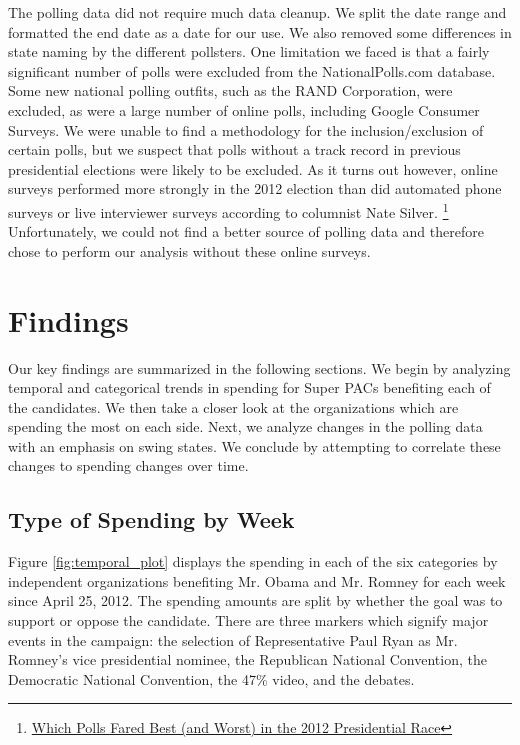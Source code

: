 \documentclass[11pt]{article}\usepackage{graphicx, color}
\begin{document}
The polling data did not require much data cleanup. We split the date range and formatted the end date as a date for our use. We also removed some differences in state naming by the different pollsters.  One limitation we faced is that a fairly significant number of polls were excluded from the NationalPolls.com database.  Some new national polling outfits, such as the RAND Corporation, were excluded, as were a large number of online polls, including Google Consumer Surveys.  We were unable to find a methodology for the inclusion/exclusion of certain polls, but we suspect that polls without a track record in previous presidential elections were likely to be excluded.  As it turns out however, online surveys performed more strongly in the 2012 election than did automated phone surveys or live interviewer surveys according to columnist Nate Silver. \footnote{\href{http://fivethirtyeight.blogs.nytimes.com/2012/11/10/which-polls-fared-best-and-worst-in-the-2012-presidential-race/}{Which Polls Fared Best (and Worst) in the 2012 Presidential Race}} Unfortunately, we could not find a better source of polling data and therefore chose to perform our analysis without these online surveys.


\section{Findings}
Our key findings are summarized in the following sections.  We begin by analyzing temporal and categorical trends in spending for Super PACs benefiting each of the candidates.  We then take a closer look at the organizations which are spending the most on each side.  Next, we analyze changes in the polling data with an emphasis on swing states.  We conclude by attempting to correlate these changes to spending changes over time.

\subsection{Type of Spending by Week}
Figure \ref{fig:temporal_plot} displays the spending in each of the six categories by independent organizations benefiting Mr. Obama and Mr. Romney for each week since April 25, 2012. The spending amounts are split by whether the goal was to support or oppose the candidate. There are three markers which signify major events in the campaign: the selection of Representative Paul Ryan as Mr. Romney's vice presidential nominee, the Republican National Convention, the Democratic National Convention, the 47\% video, and the debates.
\end{document}
